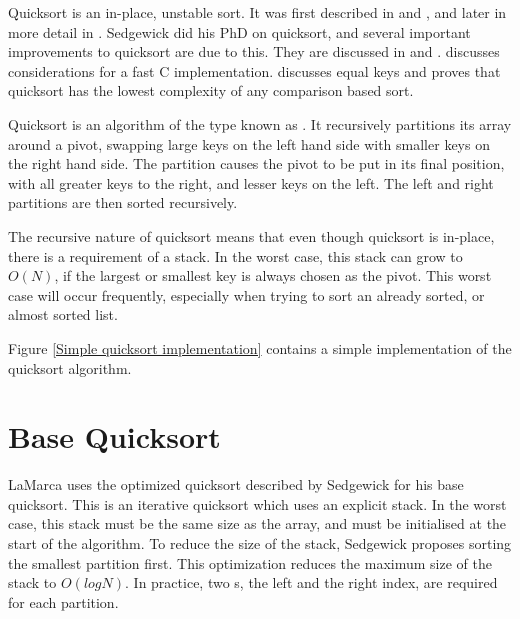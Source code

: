 \label{quick}

Quicksort is an in-place, unstable sort. It was first described in
\cite{HoarePartition61} and \cite{HoareQuicksort61}, and later in more detail in
\cite{Hoare62}. Sedgewick did his PhD on quicksort, and several important
improvements to quicksort are due to this. They are discussed in
\cite{Sedgewick78} and \cite{Sedgewick02}. \cite{BentleyMcIlroy93} discusses
considerations for a fast C implementation. \cite{SedgewickBentley02} discusses
equal keys and proves that quicksort has the lowest complexity of any comparison
based sort.

Quicksort is an algorithm of the type known as . It
recursively partitions its array around a pivot, swapping large keys on
the left hand side with smaller keys on the right hand side. The partition
causes the pivot to be put in its final position, with all greater keys to the
right, and lesser keys on the left. The left and right partitions are then
sorted recursively.

The recursive nature of quicksort means that even though quicksort is in-place,
there is a requirement of a stack. In the worst case, this stack can grow to
$O(N)$, if the largest or smallest key is always chosen as the pivot. This
worst case will occur frequently, especially when trying to sort an already
sorted, or almost sorted list.

Figure \vref{Simple quicksort implementation} contains a simple implementation of
the quicksort algorithm.


\section{Base Quicksort}

LaMarca uses the optimized quicksort described by Sedgewick for his base
quicksort. This is an iterative quicksort which uses an explicit stack. In the
worst case, this stack must be the same size as the array, and must be
initialised at the start of the algorithm. To reduce the size of the stack,
Sedgewick proposes sorting the smallest partition first. This optimization
reduces the maximum size of the stack to $O(logN)$. In practice, two s,
the left and the right index, are required for each partition.


